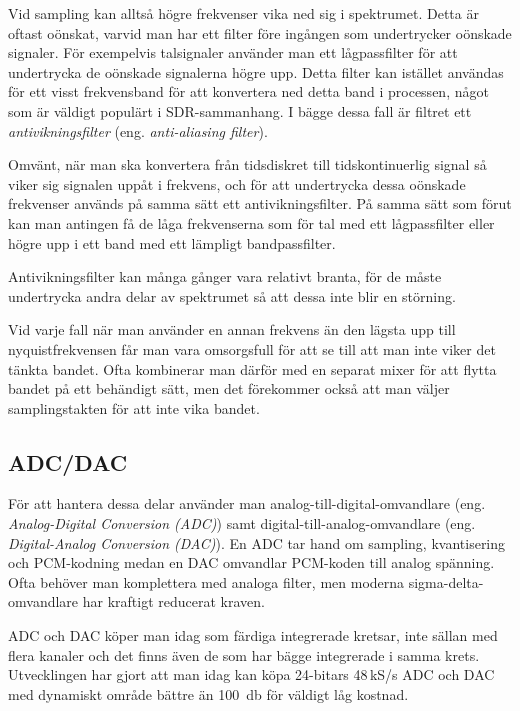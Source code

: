 Vid sampling kan alltså högre frekvenser vika ned sig i spektrumet.
Detta är oftast oönskat, varvid man har ett filter före ingången som
undertrycker oönskade signaler.
För exempelvis talsignaler använder man ett lågpassfilter för att undertrycka de
oönskade signalerna högre upp.
Detta filter kan istället användas för ett visst frekvensband för att
konvertera ned detta band i processen, något som är väldigt populärt i
SDR-sammanhang.
I bägge dessa fall är filtret ett \emph{antivikningsfilter} (eng.
\emph{anti-aliasing filter}).

Omvänt, när man ska konvertera från tidsdiskret till tidskontinuerlig
signal så viker sig signalen uppåt i frekvens, och för att undertrycka dessa
oönskade frekvenser används på samma sätt ett antivikningsfilter.
På samma sätt som förut kan man antingen få de låga frekvenserna som för tal
med ett lågpassfilter eller högre upp i ett band med ett lämpligt
bandpassfilter.

Antivikningsfilter kan många gånger vara relativt branta, för de måste
undertrycka andra delar av spektrumet så att dessa inte blir en störning.

Vid varje fall när man använder en annan frekvens än den lägsta upp till
nyquistfrekvensen får man vara omsorgsfull för att se till att man inte viker
det tänkta bandet.
Ofta kombinerar man därför med en separat mixer för att flytta bandet på ett
behändigt sätt, men det förekommer också att man väljer samplingstakten för att
inte vika bandet.

\subsection{ADC/DAC}

För att hantera dessa delar använder man analog-till-digital-omvandlare
(eng. \emph{Analog-Digital Conversion (ADC)}) samt digital-till-analog-omvandlare 
(eng. \emph{Digital-Analog Conversion (DAC)}).
En ADC tar hand om sampling, kvantisering och PCM-kodning medan en DAC
omvandlar PCM-koden till analog spänning.
Ofta behöver man komplettera med analoga filter, men moderna sigma-delta-omvandlare 
har kraftigt reducerat kraven.

ADC och DAC köper man idag som färdiga integrerade kretsar, inte sällan med
flera kanaler och det finns även de som har bägge integrerade i samma krets.
Utvecklingen har gjort att man idag kan köpa 24-bitars 48\,kS/s ADC och DAC med
dynamiskt område bättre än \SI{100}{\decibel} för väldigt låg kostnad.
